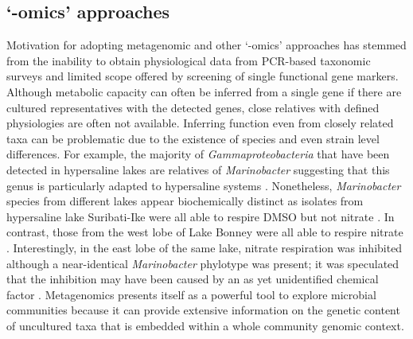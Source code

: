 \subsection{`-omics' approaches}
Motivation for adopting metagenomic and other `-omics' approaches has stemmed from the inability to obtain physiological data from \ac{PCR}-based taxonomic surveys and limited scope offered by screening of single functional gene markers.
Although metabolic capacity can often be inferred from a single gene if there are cultured representatives with the detected genes, close relatives with defined physiologies are often not available.
Inferring function even from closely related taxa can be problematic due to the existence of species and even strain level differences.
For example, the majority of \emph{Gammaproteobacteria} that have been detected in hypersaline lakes are relatives of \emph{Marinobacter} suggesting that this genus is particularly adapted to hypersaline systems \cite{Bowman2000a, Glatz2006, Matsuzaki2006, Mosier2007}.
Nonetheless, \emph{Marinobacter} species from different lakes appear biochemically distinct as isolates from hypersaline lake Suribati-Ike were all able to respire \ac{DMSO} but not nitrate \cite{Matsuzaki2006}. 
In contrast, those from the west lobe of Lake Bonney were all able to respire nitrate \cite{Ward1997}. 
Interestingly, in the east lobe of the same lake, nitrate respiration was inhibited although a near-identical \emph{Marinobacter} phylotype was present; it was speculated that the inhibition may have been caused by an as yet unidentified chemical factor \cite{Ward2005, Glatz2006}.
Metagenomics presents itself as a powerful tool to explore microbial communities because it can provide extensive information on the genetic content of uncultured taxa that is embedded within a whole community genomic context.
 
